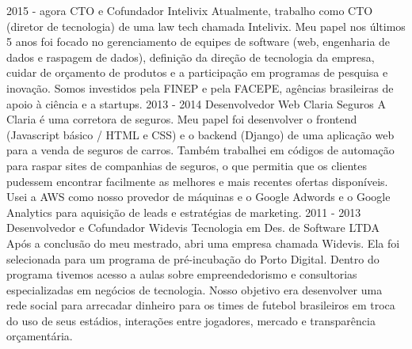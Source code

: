 
\cvevent
    {2015 - agora}
    {CTO e Cofundador}
    {Intelivix}
    {Atualmente, trabalho como CTO (diretor de tecnologia) de uma law tech chamada Intelivix. Meu papel nos últimos 5 anos foi focado no gerenciamento de equipes de software (web, engenharia de dados e raspagem de dados), definição da direção de tecnologia da empresa, cuidar de orçamento de produtos e a participação em programas de pesquisa e inovação. Somos investidos pela FINEP e pela FACEPE, agências brasileiras de apoio à ciência e a startups.}
    {}
    {}
    {}
\cvevent
    {2013 - 2014}
    {Desenvolvedor Web}
    {Claria Seguros}
    {A Claria é uma corretora de seguros. Meu papel foi desenvolver o frontend (Javascript básico / HTML e CSS) e o backend (Django) de uma aplicação web para a venda de seguros de carros. Também trabalhei em códigos de automação para raspar sites de companhias de seguros, o que permitia que os clientes pudessem encontrar facilmente as melhores e mais recentes ofertas disponíveis. Usei a AWS como nosso provedor de máquinas e o Google Adwords e o Google Analytics para aquisição de leads e estratégias de marketing.}
    {}
    {}
    {}
\cvevent
    {2011 - 2013}
    {Desenvolvedor e Cofundador}
    {Widevis Tecnologia em Des. de Software LTDA}
    {Após a conclusão do meu mestrado, abri uma empresa chamada Widevis. Ela foi selecionada para um programa de pré-incubação do Porto Digital. Dentro do programa tivemos acesso a aulas sobre empreendedorismo e consultorias especializadas em negócios de tecnologia. Nosso objetivo era desenvolver uma rede social para arrecadar dinheiro para os times de futebol brasileiros em troca do uso de seus estádios, interações entre jogadores, mercado e transparência orçamentária.}
